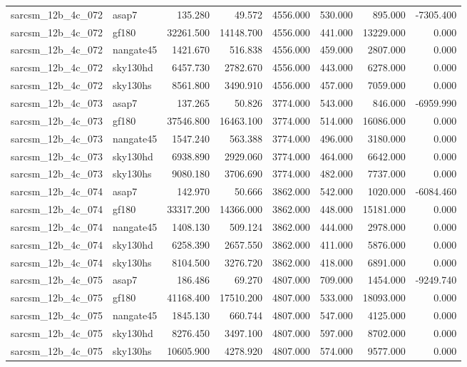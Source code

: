 \begin{tabular}{llrrrrrr}
sarcsm\_12b\_4c\_072 & asap7 & 135.280 & 49.572 & 4556.000 & 530.000 & 895.000 & -7305.400 \\
sarcsm\_12b\_4c\_072 & gf180 & 32261.500 & 14148.700 & 4556.000 & 441.000 & 13229.000 & 0.000 \\
sarcsm\_12b\_4c\_072 & nangate45 & 1421.670 & 516.838 & 4556.000 & 459.000 & 2807.000 & 0.000 \\
sarcsm\_12b\_4c\_072 & sky130hd & 6457.730 & 2782.670 & 4556.000 & 443.000 & 6278.000 & 0.000 \\
sarcsm\_12b\_4c\_072 & sky130hs & 8561.800 & 3490.910 & 4556.000 & 457.000 & 7059.000 & 0.000 \\
sarcsm\_12b\_4c\_073 & asap7 & 137.265 & 50.826 & 3774.000 & 543.000 & 846.000 & -6959.990 \\
sarcsm\_12b\_4c\_073 & gf180 & 37546.800 & 16463.100 & 3774.000 & 514.000 & 16086.000 & 0.000 \\
sarcsm\_12b\_4c\_073 & nangate45 & 1547.240 & 563.388 & 3774.000 & 496.000 & 3180.000 & 0.000 \\
sarcsm\_12b\_4c\_073 & sky130hd & 6938.890 & 2929.060 & 3774.000 & 464.000 & 6642.000 & 0.000 \\
sarcsm\_12b\_4c\_073 & sky130hs & 9080.180 & 3706.690 & 3774.000 & 482.000 & 7737.000 & 0.000 \\
sarcsm\_12b\_4c\_074 & asap7 & 142.970 & 50.666 & 3862.000 & 542.000 & 1020.000 & -6084.460 \\
sarcsm\_12b\_4c\_074 & gf180 & 33317.200 & 14366.000 & 3862.000 & 448.000 & 15181.000 & 0.000 \\
sarcsm\_12b\_4c\_074 & nangate45 & 1408.130 & 509.124 & 3862.000 & 444.000 & 2978.000 & 0.000 \\
sarcsm\_12b\_4c\_074 & sky130hd & 6258.390 & 2657.550 & 3862.000 & 411.000 & 5876.000 & 0.000 \\
sarcsm\_12b\_4c\_074 & sky130hs & 8104.500 & 3276.720 & 3862.000 & 418.000 & 6891.000 & 0.000 \\
sarcsm\_12b\_4c\_075 & asap7 & 186.486 & 69.270 & 4807.000 & 709.000 & 1454.000 & -9249.740 \\
sarcsm\_12b\_4c\_075 & gf180 & 41168.400 & 17510.200 & 4807.000 & 533.000 & 18093.000 & 0.000 \\
sarcsm\_12b\_4c\_075 & nangate45 & 1845.130 & 660.744 & 4807.000 & 547.000 & 4125.000 & 0.000 \\
sarcsm\_12b\_4c\_075 & sky130hd & 8276.450 & 3497.100 & 4807.000 & 597.000 & 8702.000 & 0.000 \\
sarcsm\_12b\_4c\_075 & sky130hs & 10605.900 & 4278.920 & 4807.000 & 574.000 & 9577.000 & 0.000 \\

\end{tabular}

